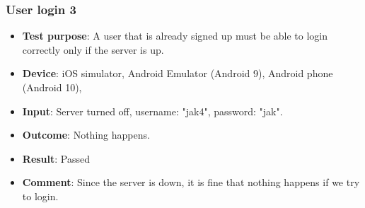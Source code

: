 \documentclass[../ATD.tex]{subfiles}
\begin{document}
    \subsubsection{User login 3}\label{subsubsec:user-login-3}
    \begin{itemize}
        \item \textbf{Test purpose}: A user that is already signed up must be able to login correctly only if the server is up.
        \item \textbf{Device}: iOS simulator, Android Emulator (Android 9), Android phone (Android 10),
        \item \textbf{Input}: Server turned off, username: "jak4", password: "jak".
        \item \textbf{Outcome}: Nothing happens.
        \item \textbf{Result}: Passed
        \item \textbf{Comment}: Since the server is down, it is fine that nothing happens if we try to login.
    \end{itemize}
\end{document}
